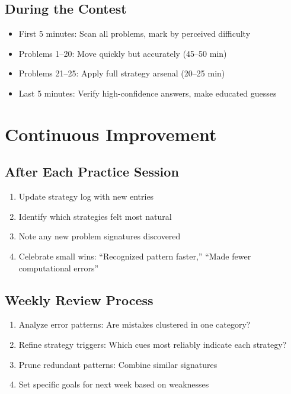 \documentclass[]{article}
\begin{document}
\subsection{During the Contest}
\begin{itemize}[leftmargin=*]
    \item First 5 minutes: Scan all problems, mark by perceived difficulty
    \item Problems 1--20: Move quickly but accurately (45--50 min)
    \item Problems 21--25: Apply full strategy arsenal (20--25 min)
    \item Last 5 minutes: Verify high-confidence answers, make educated guesses
\end{itemize}

\section{Continuous Improvement}

\subsection{After Each Practice Session}
\begin{enumerate}
    \item Update strategy log with new entries
    \item Identify which strategies felt most natural
    \item Note any new problem signatures discovered
    \item Celebrate small wins: ``Recognized pattern faster,'' ``Made fewer computational errors''
\end{enumerate}

\subsection{Weekly Review Process}
\begin{enumerate}
    \item Analyze error patterns: Are mistakes clustered in one category?
    \item Refine strategy triggers: Which cues most reliably indicate each strategy?
    \item Prune redundant patterns: Combine similar signatures
    \item Set specific goals for next week based on weaknesses
\end{enumerate}
\end{document}
